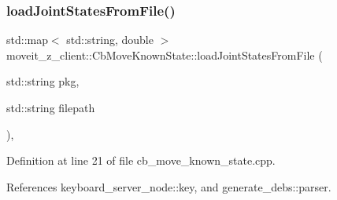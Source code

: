 \subsubsection{\texorpdfstring{load\+Joint\+States\+From\+File()}{loadJointStatesFromFile()}}
{\footnotesize\ttfamily std\+::map$<$ std\+::string, double $>$ moveit\+\_\+z\+\_\+client\+::\+Cb\+Move\+Known\+State\+::load\+Joint\+States\+From\+File (\begin{DoxyParamCaption}\item[{std\+::string}]{pkg,  }\item[{std\+::string}]{filepath }\end{DoxyParamCaption})\hspace{0.3cm}{\ttfamily [static]}, {\ttfamily [private]}}



Definition at line 21 of file cb\+\_\+move\+\_\+known\+\_\+state.\+cpp.



References keyboard\+\_\+server\+\_\+node\+::key, and generate\+\_\+debs\+::parser.


